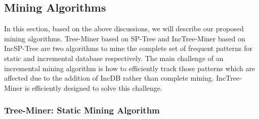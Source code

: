 \subsection{Mining Algorithms}
In this section, based on the above discussions, we will describe our proposed
mining algorithms. Tree-Miner based on SP-Tree and IncTree-Miner based on IncSP-Tree are two algorithms to mine the complete set of frequent patterns for static and incremental database respectively. The main challenge of an incremental mining algorithm is how to efficiently track those patterns which are affected due to the addition of IncDB rather than complete mining. IncTree-Miner is efficiently designed to solve this challenge.

\subsubsection{Tree-Miner: Static Mining Algorithm}
